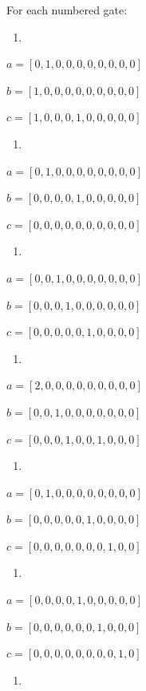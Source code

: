 \documentclass[11pt]{article}
\begin{document}
For each numbered gate:

\begin{enumerate}
\item
\end{enumerate}

\(a = [0,1,0,0,0,0,0,0,0,0]\)

\(b=[1,0,0,0,0,0,0,0,0,0]\)

\(c=[1,0,0,0,1,0,0,0,0,0]\)

\begin{enumerate}
\item
\end{enumerate}

\(a = [0,1,0,0,0,0,0,0,0,0]\)

\(b=[0,0,0,0,1,0,0,0,0,0]\)

\(c=[0,0,0,0,0,0,0,0,0,0]\)

\begin{enumerate}
\item
\end{enumerate}

\(a=[0,0,1,0,0,0,0,0,0,0]\)

\(b=[0,0,0,1,0,0,0,0,0,0]\)

\(c=[0,0,0,0,0,1,0,0,0,0]\)

\begin{enumerate}
\item
\end{enumerate}

\(a=[2,0,0,0,0,0,0,0,0,0]\)

\(b=[0,0,1,0,0,0,0,0,0,0]\)

\(c=[0,0,0,1,0,0,1,0,0,0]\)

\begin{enumerate}
\item
\end{enumerate}

\(a=[0,1,0,0,0,0,0,0,0,0]\)

\(b=[0,0,0,0,0,1,0,0,0,0]\)

\(c=[0,0,0,0,0,0,0,1,0,0]\)

\begin{enumerate}
\item
\end{enumerate}

\(a=[0,0,0,0,1,0,0,0,0,0]\)

\(b=[0,0,0,0,0,0,1,0,0,0]\)

\(c=[0,0,0,0,0,0,0,0,1,0]\)

\begin{enumerate}
\item
\end{enumerate}
\end{document}
